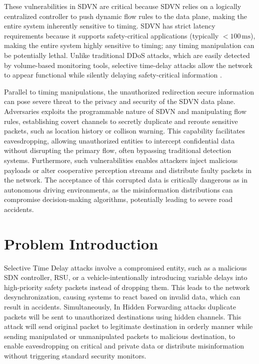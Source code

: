 \documentclass[12pt, a4paper]{report}
\begin{document}
These vulnerabilities in SDVN are critical because SDVN relies on a logically centralized controller to push dynamic flow rules to the data plane, making the entire system inherently sensitive to timing\cite{8187644}\cite{7981537}. SDVN has strict latency requirements because it supports safety-critical applications (typically $<100\,\mathrm{ms}$), making the entire system highly sensitive to timing; any timing manipulation can be potentially lethal.\cite{Timing_Attack}\cite{KALUPAHANALIYANAGE2018226}
Unlike traditional DDoS attacks, which are easily detected by volume-based monitoring tools, selective time-delay attacks allow the network to appear functional while silently delaying safety-critical information \cite{PASCOAL2020107223}\cite{DBLP:journals/air/QammarKND23}.

Parallel to timing manipulations, the unauthorized redirection secure information can pose severe threat to the privacy and security of the SDVN data plane. Adversaries exploits the programmable nature of SDVN and manipulating flow rules, establishing covert channels to secretly duplicate and reroute sensitive packets, such as location history or collison warning. This capability facilitates eavesdropping, allowing unauthorized entities to intercept confidential data without disrupting the primary flow, often bypassing traditional detection systems\cite{mohammadi2016detecting}. Furthermore, such vulnerabilities enables attackers inject malicious payloads or alter cooperative perception streams and distribute faulty packets in the network. The acceptance of this corrupted data is critically dangerous as  in autonomous driving environments, as the misinformation distributions can compromise decision-making algorithms, potentially leading to severe road accidents\cite{Cardona_2020}\cite{8616999}.

\section{Problem Introduction}

Selective Time Delay attacks involve a compromised entity, such as a malicious SDN controller, RSU, or a vehicle-intentionally introducing variable delays into high-priority safety packets \cite{Timing_Attack} instead of dropping them\cite{Timing_Attack}. This leads to the network desynchronization, causing systems to react based on invalid data, which can result in accidents\cite{Timing_Attack}. Simultaneously, In Hidden Forwarding attacks duplicate packets will be sent to unauthorized destinations using hidden channels. This attack will send original packet to legitimate destination in orderly manner while sending manipulated or unmanipulated packets to malicious destination, to enable eavesdropping on critical and private data or distribute misinformation without triggering standard security monitors.
\end{document}
